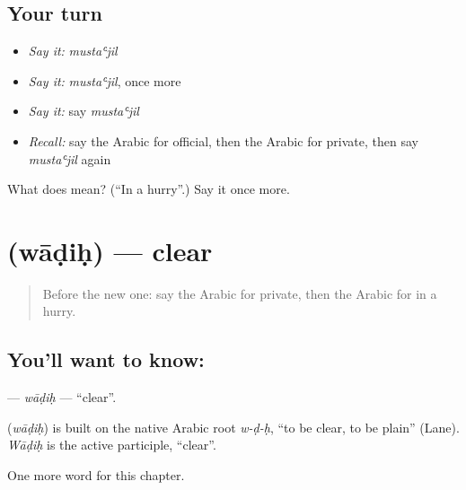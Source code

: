 \subsection*{Your turn}
\begin{itemize}
\raggedright
  \item \emph{Say it:} \emph{mustaʿjil}
  \item \emph{Say it:} \emph{mustaʿjil}, once more
  \item \emph{Say it:} say \emph{mustaʿjil}
  \item \emph{Recall:} say the Arabic for official, then the Arabic for private, then say \emph{mustaʿjil} again
\end{itemize}

\begin{tcolorbox}[breakable,colback=teal!4,colframe=teal!35!black,title={Before you move on}]
What does  mean? (\textquotedblleft{}In a hurry\textquotedblright{}.) Say it once more.
\end{tcolorbox}
\section[\texorpdfstring{\ar{واضح} (wāḍiḥ)}{واضح (wāḍiḥ)}]{ (wāḍiḥ) — clear}

\label{lesson:AR-C178-wadih}



\begin{quote}
Before the new one: say the Arabic for private, then the Arabic for in a hurry.
\end{quote}

\subsection*{You'll want to know: }
\textbf{} — \emph{wāḍiḥ} — \textquotedblleft{}clear\textquotedblright{}.

\begin{cousinweb}
\textbf{} (\emph{wāḍiḥ}) is built on the native Arabic root \emph{w-ḍ-ḥ}, \textquotedblleft{}to be clear, to be plain\textquotedblright{} (Lane). \emph{Wāḍiḥ} is the active participle, \textquotedblleft{}clear\textquotedblright{}.
\end{cousinweb}

\begin{grammarlens}[title={What you've built}]
One more word for this chapter.
\end{grammarlens}

